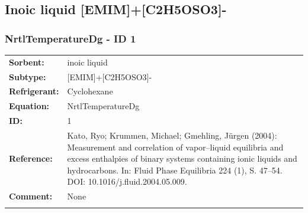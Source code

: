 \subsection{Inoic liquid [EMIM]+[C2H5OSO3]-}
%
\subsubsection{NrtlTemperatureDg - ID 1}
%
\begin{tabular}[l]{|lp{11.5cm}|}
\hline
\addlinespace

\textbf{Sorbent:} & inoic liquid \\
\textbf{Subtype:} & [EMIM]+[C2H5OSO3]- \\
\textbf{Refrigerant:} & Cyclohexane \\
\textbf{Equation:} & NrtlTemperatureDg \\
\textbf{ID:} & 1 \\
\textbf{Reference:} & Kato, Ryo; Krummen, Michael; Gmehling, Jürgen (2004): Measurement and correlation of vapor–liquid equilibria and excess enthalpies of binary systems containing ionic liquids and hydrocarbons. In: Fluid Phase Equilibria 224 (1), S. 47–54. DOI: 10.1016/j.fluid.2004.05.009. \\
\textbf{Comment:} & None \\

\addlinespace
\hline
\end{tabular}
\newline

